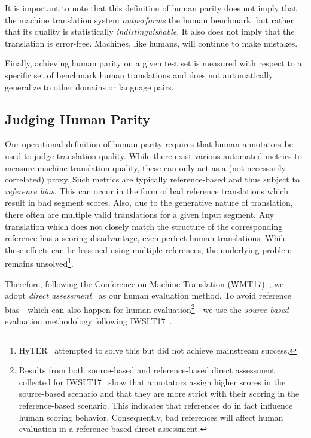 \documentclass[a4paper]{article}
\begin{document}
\begin{CJK*}{UTF8}{gbsn}
It is important to note that this definition of human parity does not imply that the machine translation system \emph{outperforms} the human benchmark, but rather that its quality is statistically \emph{indistinguishable}. It also does not imply that the translation is error-free. Machines, like humans, will continue to make mistakes.

Finally, achieving human parity on a given test set is measured with respect to a specific set of benchmark human translations and does not automatically generalize to other domains or language pairs. 

\subsection{Judging Human Parity}
Our operational definition of human parity requires that human annotators be used to judge translation quality. While there exist various automated metrics to measure machine translation quality, these can only act as a (not necessarily correlated) proxy. Such metrics are typically reference-based and thus subject to \emph{reference bias}. This can occur in the form of bad reference translations which result in bad segment scores. Also, due to the generative nature of translation, there often are multiple valid translations for a given input segment. Any translation which does not closely match the structure of the corresponding reference has a scoring disadvantage, even perfect human translations. While these effects can be lessened using multiple references, the underlying problem remains unsolved\footnote{HyTER~\cite{dreyer2012hyter} attempted to solve this but did not achieve mainstream success.}.







Therefore, following the Conference on Machine Translation (WMT17)~\cite{bojar-EtAl:2017:WMT1}, we adopt \emph{direct assessment}~\cite{yvetteDA}  as our human evaluation method. To avoid reference bias---which can also happen for human evaluation\footnote{Results from both source-based and reference-based direct assessment collected for IWSLT17~\cite{IWSLT17} show that annotators assign higher scores in the source-based scenario and that they are more strict with their scoring in the reference-based scenario. This indicates that references do in fact influence human scoring behavior. Consequently, bad references will affect human evaluation in a reference-based direct assessment.}---we use the \emph{source-based} evaluation methodology following IWSLT17~\cite{IWSLT17}. 


\end{CJK*}
\end{document}
